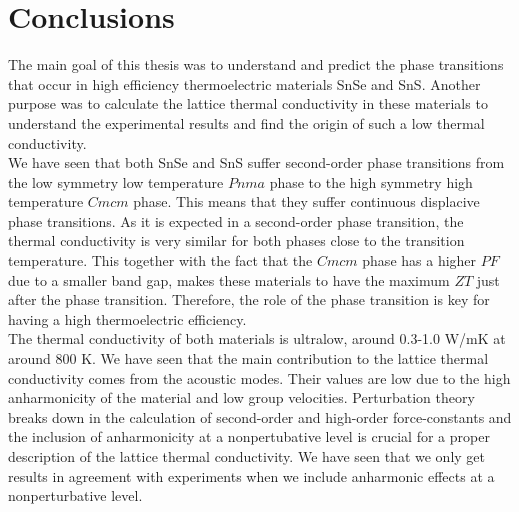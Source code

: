 
\chapter*{Conclusions} %

\label{Chapter9} %


The main goal of this thesis was to understand and predict the phase transitions that occur in high efficiency 
thermoelectric materials SnSe and SnS. Another purpose was to calculate the lattice thermal conductivity in these 
materials to understand the experimental results and find the origin of such a low thermal conductivity. \\

We have seen that both SnSe and SnS suffer second-order phase transitions from the low symmetry low temperature 
$Pnma$ phase to the high symmetry high temperature $Cmcm$ phase. This means that they suffer continuous displacive 
phase transitions. As it is expected in a second-order phase transition, the thermal conductivity is very similar 
for both phases close to the transition temperature. This together with the fact that the $Cmcm$ phase has a 
higher $PF$ due to a smaller band gap, makes these materials to have the maximum $ZT$ just after the phase 
transition. Therefore, the role of the phase transition is key for having a high thermoelectric efficiency. \\

The thermal conductivity of both materials is ultralow, around 0.3-1.0 W/mK at around $800$ K. We have seen that the 
main contribution to the lattice thermal conductivity comes from the acoustic modes. Their values are low due to the 
high anharmonicity of the material and low group velocities. Perturbation theory breaks down in the calculation of 
second-order and high-order force-constants and the inclusion of anharmonicity at a nonpertubative level is crucial 
for a proper description of the lattice thermal conductivity. We have seen that we only get results in agreement 
with experiments when we include anharmonic effects at a nonperturbative level. \\

